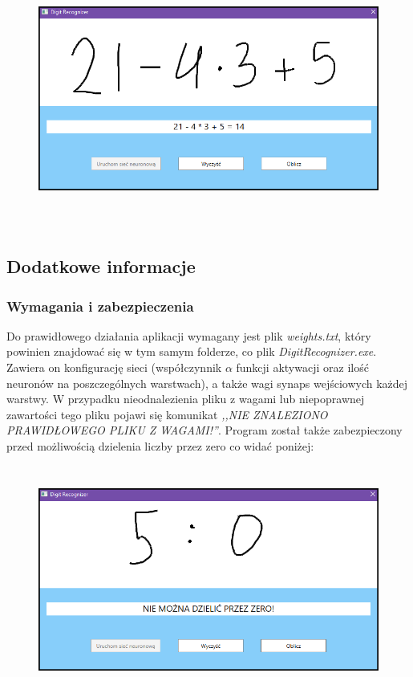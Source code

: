 \documentclass[12pt,a4paper]{article}
\begin{document}
	\begin{figure}[h!]
	\centering
	\includegraphics[height=8.5cm]{graphics/app3.png}
	\end{figure}
\subsection*{Dodatkowe informacje}
\subsubsection*{Wymagania i zabezpieczenia}
    \hspace{20pt}Do prawidłowego działania aplikacji wymagany jest plik \textit{weights.txt}, który powinien znajdować się w tym samym folderze, co plik \textit{DigitRecognizer.exe}. Zawiera on konfigurację sieci (współczynnik $\alpha$ funkcji aktywacji oraz ilość neuronów na poszczególnych warstwach), a także wagi synaps wejściowych każdej warstwy. W przypadku nieodnalezienia pliku z wagami lub niepoprawnej zawartości tego pliku pojawi się komunikat \textit{,,NIE ZNALEZIONO PRAWIDŁOWEGO PLIKU Z WAGAMI!''}. Program został także zabezpieczony przed możliwością dzielenia liczby przez zero co widać poniżej: 
    \begin{figure}[h!]
	\centering
	\includegraphics[height=7.5cm]{graphics/app4.png}
	\end{figure}
    
\end{document}
